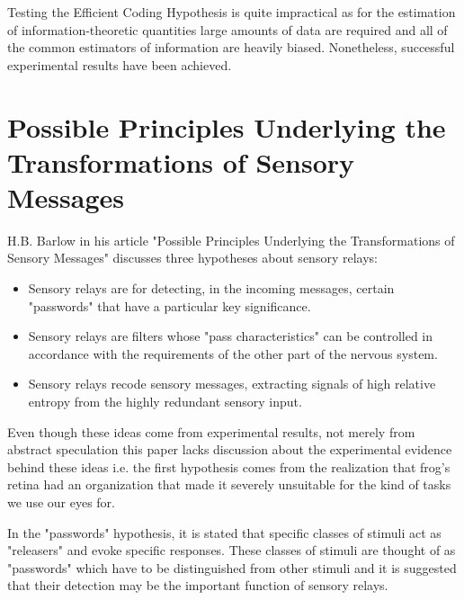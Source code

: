 \documentclass[twoside]{article}
\begin{document}
\begin{multicols}{2}
Testing the Efficient Coding Hypothesis is quite impractical as for the estimation of information-theoretic quantities large amounts of data are required and all of the common estimators of information are heavily biased. Nonetheless, successful experimental results have been achieved.







\section{Possible Principles Underlying the Transformations of Sensory Messages}

H.B. Barlow in his article "Possible Principles Underlying the Transformations of Sensory Messages" discusses three hypotheses about sensory relays:
\begin{itemize}
	\item Sensory relays are for detecting, in the incoming messages, certain "passwords" that have a particular key significance.
	\item Sensory relays are filters whose "pass characteristics" can be controlled in accordance with the requirements of the other part of the nervous system.
	\item Sensory relays recode sensory messages, extracting signals of high relative entropy from the highly redundant sensory input.
\end{itemize}

Even though these ideas come from experimental results, not merely from abstract speculation this paper lacks discussion about the experimental evidence behind these ideas i.e. the first hypothesis comes from the realization that frog's retina had an organization that made it severely unsuitable for the kind of tasks we use our eyes for. 

In the "passwords" hypothesis, it is stated that specific classes of stimuli act as "releasers" and evoke specific responses. These classes of stimuli are thought of as "passwords" which have to be distinguished from other stimuli and it is suggested that their detection may be the important function of sensory relays. 


\end{multicols}
\end{document}
